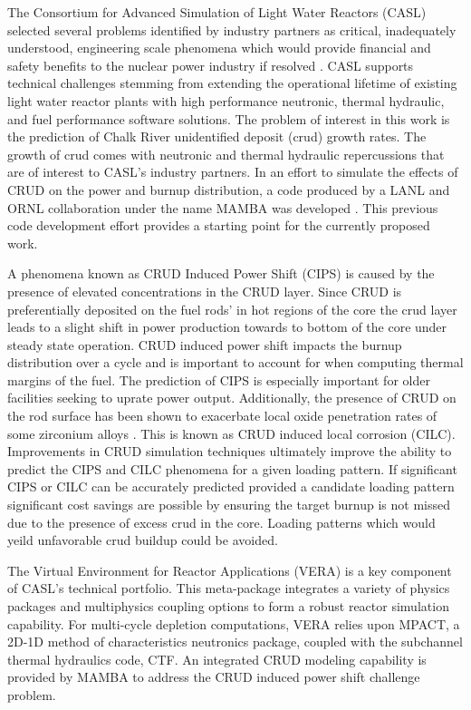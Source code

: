 
The Consortium for Advanced Simulation of Light Water Reactors (CASL) selected several problems identified by industry partners as critical, inadequately understood, engineering scale phenomena which would provide
financial and safety benefits to the nuclear power industry if resolved \cite{Turinsky15}.  CASL supports technical challenges stemming from extending the operational lifetime of existing light water reactor plants with high performance neutronic, thermal hydraulic, and fuel performance software solutions.
The problem of
interest in this work is the prediction of Chalk River unidentified deposit
(crud) growth rates.  The growth of crud comes with neutronic and thermal
hydraulic repercussions that are of interest to CASL's industry partners.
In an effort to simulate the
effects of CRUD on the power and burnup distribution, a code produced by a LANL
and ORNL collaboration under the name MAMBA was developed  \cite{collins16}.
This previous code development effort provides a starting point for the currently proposed work.

A phenomena known as CRUD Induced Power Shift (CIPS) is caused by the presence
of elevated  concentrations in the CRUD layer.  Since CRUD is preferentially
deposited on the fuel rods' in hot regions of the core the crud layer leads to a slight shift in
power production towards to bottom of the core under steady state operation.  
CRUD induced power shift impacts the burnup distribution over a cycle
and is important to account for when computing thermal
margins of the fuel.  The prediction
of CIPS is especially important for older facilities seeking to uprate power
output.  Additionally, the presence of CRUD on the rod surface has been shown
to exacerbate local oxide penetration rates of some zirconium alloys \cite{adamson07}.
This is known as CRUD induced local corrosion (CILC).  Improvements in CRUD
simulation techniques ultimately improve the ability to predict the CIPS and
CILC phenomena for a given loading pattern.  If significant CIPS or CILC can be accurately predicted provided a candidate loading pattern significant cost savings are possible by ensuring the target burnup is not missed due to the presence of excess crud in the core.  Loading patterns which would yeild unfavorable crud buildup could be avoided.

The Virtual Environment for Reactor Applications (VERA) is a key component of
CASL's technical portfolio.  This meta-package integrates a variety of physics
packages and multiphysics coupling options to form a robust reactor simulation
capability.  For multi-cycle depletion computations, VERA relies upon MPACT, a
2D-1D method of characteristics neutronics package, coupled with the subchannel
thermal hydraulics code, CTF.  An integrated CRUD modeling capability
is provided by MAMBA to address the CRUD induced power shift challenge problem.

